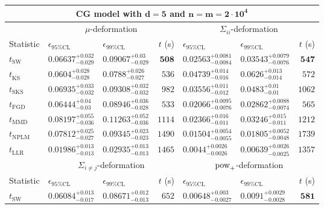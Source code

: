 \begin{tabular}{l|llr|llr}
	\toprule
	\multicolumn{7}{c}{{\bf CG model with $\mathbf{d=5}$ and $\mathbf{n=m=2\cdot 10^{4}}$}} \\
	\toprule
	\multicolumn{1}{c}{} & \multicolumn{3}{c}{$\mu$-deformation} & \multicolumn{3}{c}{$\Sigma_{ii}$-deformation} \\
	Statistic & $\epsilon_{95\%\mathrm{CL}}$ & $\epsilon_{99\%\mathrm{CL}}$ & $t$ (s) & $\epsilon_{95\%\mathrm{CL}}$ & $\epsilon_{99\%\mathrm{CL}}$ & $t$ (s) \\
	\midrule
	$t_{\mathrm{SW}}$ & $0.06637_{-0.029}^{+0.032}$ & $0.09067_{-0.029}^{+0.03}$ & ${\mathbf{508}}$ & $0.02563_{-0.0084}^{+0.0081}$ & $0.03543_{-0.0076}^{+0.0079}$ & ${\mathbf{547}}$ \\
	$t_{\overline{\mathrm{KS}}}$ & ${\mathbf{0.0604_{-0.028}^{+0.028}}}$ & ${\mathbf{0.0788_{-0.027}^{+0.026}}}$ & $536$ & $0.04739_{-0.016}^{+0.014}$ & $0.0626_{-0.014}^{+0.013}$ & $572$ \\
	$t_{\mathrm{SKS}}$ & $0.06935_{-0.032}^{+0.033}$ & $0.09308_{-0.032}^{+0.032}$ & $982$ & $0.03556_{-0.012}^{+0.011}$ & $0.0483_{-0.01}^{+0.01}$ & $1062$ \\
	$t_{\mathrm{FGD}}$ & $0.06444_{-0.03}^{+0.04}$ & $0.08946_{-0.028}^{+0.036}$ & $533$ & ${\mathbf{0.02066_{-0.0076}^{+0.0095}}}$ & ${\mathbf{0.02862_{-0.0074}^{+0.0088}}}$ & $565$ \\
	$t_{\mathrm{MMD}}$ & $0.08197_{-0.036}^{+0.055}$ & $0.11263_{-0.036}^{+0.052}$ & $1114$ & $0.02366_{-0.011}^{+0.016}$ & $0.03246_{-0.011}^{+0.015}$ & $1212$ \\
\rowcolor{red!35}	$t_{\mathrm{NPLM}}$ & $0.07812_{-0.027}^{+0.025}$ & $0.09345_{-0.023}^{+0.023}$ & $1490$ & $0.01504_{-0.0055}^{+0.0054}$ & $0.01805_{-0.0048}^{+0.0052}$ & $1739$ \\
	$t_{\mathrm{LLR}}$ & $0.01986_{-0.013}^{+0.013}$ & $0.02935_{-0.013}^{+0.013}$ & $1465$ & $0.0044_{-0.0026}^{+0.0026}$ & $0.00639_{-0.0025}^{+0.0026}$ & $1357$ \\
	\toprule
	\multicolumn{1}{c}{} & \multicolumn{3}{c}{$\Sigma_{i\neq j}$-deformation} & \multicolumn{3}{c}{$\rm{pow}_{+}$-deformation} \\
	Statistic & $\epsilon_{95\%\mathrm{CL}}$ & $\epsilon_{99\%\mathrm{CL}}$ & $t$ (s) & $\epsilon_{95\%\mathrm{CL}}$ & $\epsilon_{99\%\mathrm{CL}}$ & $t$ (s) \\
	\midrule
	$t_{\mathrm{SW}}$ & $0.06084_{-0.017}^{+0.013}$ & $0.08671_{-0.013}^{+0.012}$ & $652$ & $0.00648_{-0.0027}^{+0.003}$ & $0.0091_{-0.0028}^{+0.0029}$ & ${\mathbf{581}}$ \\

\end{tabular}
